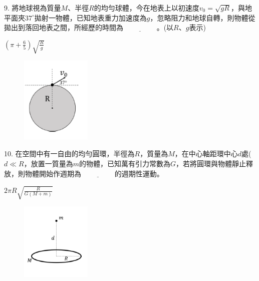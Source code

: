 \documentclass[cn,10pt,math=newtx]{elegantbook}
\begin{document}
\begin{example}
   9. 將地球視為質量$M$、半徑$R$的均勻球體，今在地表上以初速度$v_0=\sqrt{gR}$，與地平面夾$37^\circ$拋射一物體，已知地表重力加速度為$g$，忽略阻力和地球自轉，則物體從拋出到落回地表之間，所經歷的時間為$\underline{\hspace{2cm}}$。(以$R$、$g$表示)\\
    \rightline{[桃園高中教甄109]}
\end{example}
\begin{solution}
    $(\pi+\frac{6}{5}) \sqrt{\frac{R}{g}}$
\end{solution}
\begin{figure}[htbp]
    \flushright
    \includegraphics[width=0.3\textwidth]{image/109桃園9.png}
  \end{figure}
\newpage

\begin{example}
   10. 在空間中有一自由的均勻圓環，半徑為$R$，質量為$M$，在中心軸距環中心$d$處($d\ll R$，放置一質量為$m$的物體，已知萬有引力常數為$G$，若將圓環與物體靜止釋放，則物體開始作週期為$\underline{\hspace{2cm}}$的週期性運動。\\
    \rightline{[桃園高中教甄109]}
\end{example}
\begin{solution}
    $2\pi R \sqrt{\frac{R}{G(M+m)}}$
\end{solution}
\begin{figure}[htbp]
    \flushright
    \includegraphics[width=0.3\textwidth]{image/109桃園10.png}
  \end{figure}
\newpage
\end{document}

